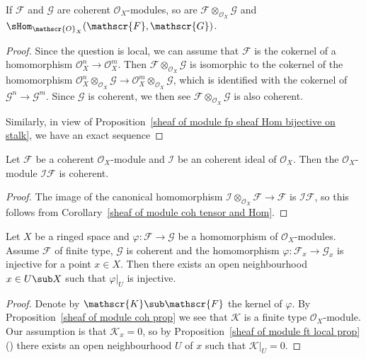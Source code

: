 \begin{corollary}\label{sheaf of module coh tensor and Hom}
If $\mathscr{F}$ and $\mathscr{G}$ are coherent $\mathscr{O}_X$-modules, so are $\mathscr{F}\otimes_{\mathscr{O}_X}\mathscr{G}$ and $\sHom_{\mathscr{O}_X}(\mathscr{F},\mathscr{G})$.
\end{corollary}
\begin{proof}
Since the question is local, we can assume that $\mathscr{F}$ is the cokernel of a homomorphism $\mathscr{O}_X^n\to\mathscr{O}_X^m$. Then $\mathscr{F}\otimes_{\mathscr{O}_X}\mathscr{G}$ is isomorphic to the cokernel of the homomorphism $\mathscr{O}_X^n\otimes_{\mathscr{O}_X}\mathscr{G}\to\mathscr{O}_X^m\otimes_{\mathscr{O}_X}\mathscr{G}$, which is identified with the cokernel of $\mathscr{G}^n\to\mathscr{G}^m$. Since $\mathscr{G}$ is coherent, we then see $\mathscr{F}\otimes_{\mathscr{O}_X}\mathscr{G}$ is also coherent.\par
Similarly, in view of Proposition~\ref{sheaf of module fp sheaf Hom bijective on stalk}, we have an exact sequence 
\end{proof}
\begin{corollary}
Let $\mathscr{F}$ be a coherent $\mathscr{O}_X$-module and $\mathscr{I}$ be an coherent ideal of $\mathscr{O}_X$. Then the $\mathscr{O}_X$-module $\mathscr{I}\mathscr{F}$ is coherent.
\end{corollary}
\begin{proof}
The image of the canonical homomorphism $\mathscr{I}\otimes_{\mathscr{O}_X}\mathscr{F}\to\mathscr{F}$ is $\mathscr{I}\mathscr{F}$, so this follows from Corollary~\ref{sheaf of module coh tensor and Hom}. 
\end{proof}
\begin{corollary}\label{sheaf of module coh injective on stalk prop}
Let $X$ be a ringed space and $\varphi:\mathscr{F}\to\mathscr{G}$ be a homomorphism of $\mathscr{O}_X$-modules. Assume $\mathscr{F}$ of finite type, $\mathscr{G}$ is coherent and the homomorphism $\varphi:\mathscr{F}_x\to\mathscr{G}_x$ is injective for a point $x\in X$. Then there exists an open neighbourhood $x\in U\sub X$ such that $\varphi|_U$ is injective.
\end{corollary}
\begin{proof}
Denote by $\mathscr{K}\sub\mathscr{F}$ the kernel of $\varphi$. By Proposition~\ref{sheaf of module coh prop} we see that $\mathscr{K}$ is a finite type $\mathscr{O}_X$-module. Our assumption is that $\mathscr{K}_x=0$, so by Proposition~\ref{sheaf of module ft local prop}() there exists an open neighbourhood $U$ of $x$ such that $\mathscr{K}|_U=0$.
\end{proof}
